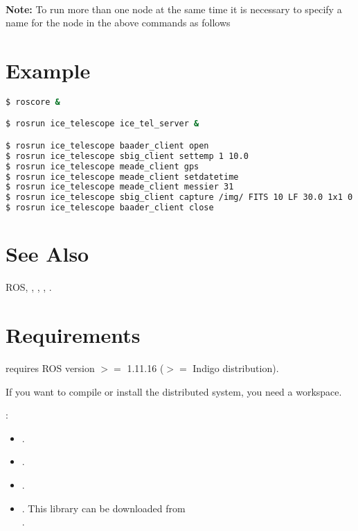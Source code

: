 \documentclass[a4paper,english]{article}
\begin{document}
    \\

\textbf{Note:} To run more than one  node at the same time it is necessary to specify a name for the node in the above commands as follows 


\section{Example}

\begin{lstlisting}[language=bash, frame=single, breaklines=true]
$ roscore &

$ rosrun ice_telescope ice_tel_server &

$ rosrun ice_telescope baader_client open
$ rosrun ice_telescope sbig_client settemp 1 10.0
$ rosrun ice_telescope meade_client gps
$ rosrun ice_telescope meade_client setdatetime
$ rosrun ice_telescope meade_client messier 31
$ rosrun ice_telescope sbig_client capture /img/ FITS 10 LF 30.0 1x1 0 0 0 0 1 1
$ rosrun ice_telescope baader_client close
\end{lstlisting}


\section{See Also}

ROS, , , , .


\section{Requirements}

\begin{description}\setlength{\itemsep}{0cm}
\item[ROS Environment]  requires ROS version $>=$ 1.11.16 ($>=$ Indigo distribution).
\item[ROS Workspace] If you want to compile or install the distributed system, you need a  workspace.
\item[Libraries]: 
	\begin{itemize}
		\item {}.
		\item {}.
		\item {}.
		\item {}. This library can be downloaded from \\ .
	\end{itemize}
\end{description}
\end{document}
